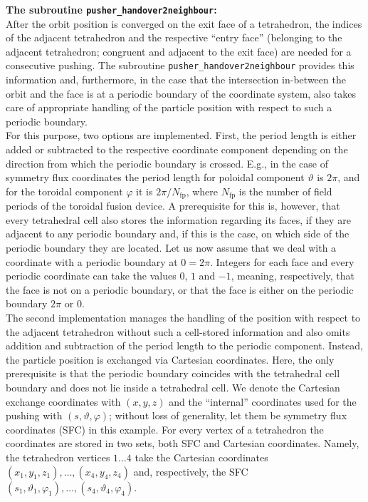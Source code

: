 \documentclass{TheMartianReport}
\begin{document}
\textbf{The subroutine \texttt{pusher\_handover2neighbour}:}\\
After the orbit position is converged on the exit face of a tetrahedron, the indices of the adjacent tetrahedron and the respective ``entry face'' (belonging to the adjacent tetrahedron; congruent and adjacent to the exit face) are needed for a consecutive pushing. The subroutine \texttt{pusher\_handover2neighbour} provides this information and, furthermore, in the case that the intersection in-between the orbit and the face is at a periodic boundary of the coordinate system, also takes care of appropriate handling of the particle position with respect to such a periodic boundary.\\
%
For this purpose, two options are implemented. First, the period length is either added or subtracted to the respective coordinate component depending on the direction from which the periodic boundary is crossed. E.g., in the case of symmetry flux coordinates\cite{dhaeseleer_flux_2012} the period length for poloidal component $\vartheta$ is $2\pi$, and for the toroidal component $\varphi$ it is $2\pi/N_\text{fp}$, where $N_\text{fp}$ is the number of field periods of the toroidal fusion device. A prerequisite for this is, however, that every tetrahedral cell also stores the information regarding its faces, if they are adjacent to any periodic boundary and, if this is the case, on which side of the periodic boundary they are located. Let us now assume that we deal with a coordinate with a periodic boundary at $0 = 2 \pi$.  Integers for each face and every periodic coordinate can take the values $0$, $1$ and $-1$, meaning, respectively, that the face is not on a periodic boundary, or that the face is either on the periodic boundary $2\pi$ or $0$.\\
%
The second implementation manages the handling of the position with respect to the adjacent tetrahedron without such a cell-stored information and also omits addition and subtraction of the period length to the periodic component. 
Instead, the particle position is exchanged via Cartesian coordinates. Here, the only prerequisite is that the periodic boundary coincides with the tetrahedral cell boundary and does not lie inside a tetrahedral cell. We denote the Cartesian exchange coordinates with $(x,y,z)$ and the ``internal'' coordinates used for the pushing with $(s,\vartheta,\varphi)$; without loss of generality, let them be symmetry flux coordinates\cite{dhaeseleer_flux_2012} (SFC) in this example. For every vertex of a tetrahedron the coordinates are stored in two sets, both SFC and Cartesian coordinates. Namely, the tetrahedron vertices $1 \dots 4$ take the Cartesian coordinates $(x_1,y_1,z_1), \dots ,(x_4,y_4,z_4)$ and, respectively, the SFC $(s_1,\vartheta_1,\varphi_1),\dots,(s_4,\vartheta_4,\varphi_4)$. \\
\end{document}
